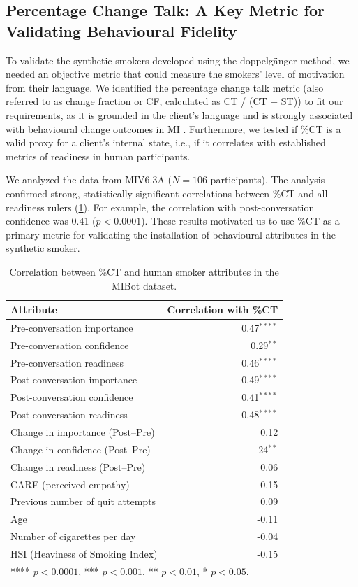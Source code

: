 \subsection*{Percentage Change Talk: A Key Metric for Validating Behavioural Fidelity}

To validate the synthetic smokers developed using the doppelgänger method, we needed an objective metric that could measure the smokers' level of motivation from their language.
We identified the percentage change talk metric (also referred to as change fraction or CF, calculated as CT / (CT + ST)) to fit our requirements, as it is grounded in the client's language and is strongly associated with behavioural change outcomes in MI \cite{Barnett2014,Houck2018,Moyers2009,Baer2008}.
Furthermore, we tested if \%CT is a valid proxy for a client's internal state, i.e., if it correlates with established metrics of readiness in human participants.

We analyzed the data from MIV6.3A ($N=106$ participants). The analysis confirmed strong, statistically significant correlations between \%CT and all readiness rulers (\cref{tab:ct-correlation}). For example, the correlation with post-conversation confidence was 0.41 ($p < 0.0001$). These results motivated us to use \%CT as a primary metric for validating the installation of behavioural attributes in the synthetic smoker.


\begin{table}[!ht]
\centering
\begin{tabular}{@{}lr@{}}
\toprule
\textbf{Attribute} & \textbf{Correlation with \%CT} \\
\midrule
Pre-conversation importance & 0.47$^{****}$ \\
Pre-conversation confidence & 0.29$^{**}$ \\
Pre-conversation readiness & 0.46$^{****}$ \\
\midrule
Post-conversation importance & 0.49$^{****}$ \\
Post-conversation confidence & 0.41$^{****}$ \\
Post-conversation readiness & 0.48$^{****}$ \\
\midrule
Change in importance (Post--Pre) & 0.12 \\
Change in confidence (Post--Pre) & 24$^{**}$ \\
Change in readiness (Post--Pre) & 0.06 \\
\midrule
CARE (perceived empathy) & 0.15 \\
Previous number of quit attempts & 0.09 \\
Age & -0.11 \\
Number of cigarettes per day & -0.04 \\
HSI (Heaviness of Smoking Index) & -0.15 \\
\bottomrule
\multicolumn{2}{l}{\footnotesize{**** $p < 0.0001$, *** $p < 0.001$, ** $p < 0.01$, * $p < 0.05$}.}
\end{tabular}
\caption{Correlation between \%CT and human smoker attributes in the MIBot dataset.}
\label{tab:ct-correlation}
\end{table}



